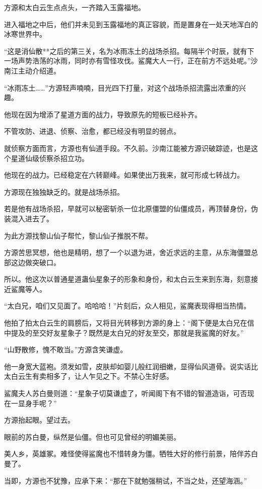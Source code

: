 \begin{this_body}
方源和太白云生点点头，一齐踏入玉露福地。

进入福地之中后，他们并未见到玉露福地的真正容貌，而是置身在一处天地浑白的冰寒世界中。

“这是消仙散**之后的第三关，名为冰雨冻土的战场杀招。每隔半个时辰，就有下一场声势浩荡的冰雨，同时亦有雪怪攻伐。鲨魔大人一行，正在前方不远处呢。”沙南江主动介绍道。

“冰雨冻土……”方源轻声喃喃，目光四下打量，对这个战场杀招流露出浓重的兴趣。

他现在因为增添了星道方面的战力，导致原先的短板已经补齐。

不管攻防、进退、侦察、治愈，都已经没有明显的弱点。

就侦察方面而言，方源也有仙道手段。不久前。沙南江能被方源识破踪迹，也是这个星道仙级侦察杀招立功。

他现在的战力。已经稳定在六转巅峰。如果使出万我来，就可形成七转战力。

方源现在独独缺乏的。就是战场杀招。

若是他有战场杀招，早就可以秘密斩杀一位北原僵盟的仙僵成员，再顶替身份，伪装混入进去了。

为此方源找黎山仙子帮忙，黎山仙子推脱不帮。

方源苦思冥想，他也是精明，想了一个以退为进，舍近求远的主意，从东海僵盟总部这边做突破口。

所以。他这次以普通星道蛊仙星象子的形象和身份，和太白云生来到东海，刻意接近鲨魔等人。

“太白兄，咱们又见面了。哈哈哈！”片刻后，众人相见，鲨魔表现得相当热情。

他拍了拍太白云生的肩膀后，又将目光转移到方源的身上：“阁下便是太白兄在信中提及的至交好友星象子？既然是太白兄的好友至交，那就是我鲨魔的好友。”

“山野散修，愧不敢当。”方源含笑谦虚。

他一身宽大蓝袍。须发如雪，皮肤却如婴儿般红润细嫩，显得仙风道骨。说实话比太白云生有卖相多了，让人乍见之下。不禁心生好感。

鲨魔夫人苏白曼则道：“星象子切莫谦虚了，听闻阁下有不错的智道造诣，可否现在一显身手呢？”

方源抬起眼。望过去。

眼前的苏白曼，纵然是仙僵。但也可见曾经的明媚美丽。

美人乡，英雄冢。难怪使得鲨魔也不惜转身为僵。牺牲大好的修行前景，陪伴苏白曼了。

当即，方源也不犹豫，应承下来：“那在下就勉强稍试，不当之处，还望海涵。”


\end{this_body}
